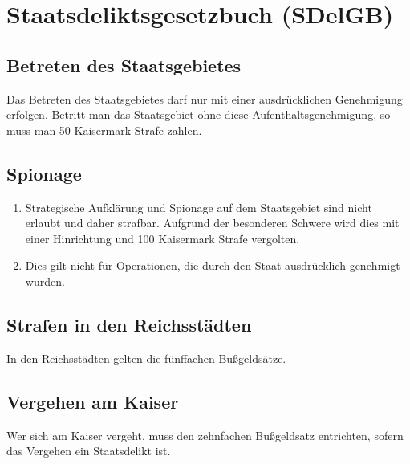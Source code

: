 \documentclass{article}
\begin{document}
\newpage
\section{Staatsdeliktsgesetzbuch (SDelGB)}
\localtableofcontents

\subsection{Betreten des Staatsgebietes}
Das Betreten des Staatsgebietes darf nur mit einer ausdrücklichen Genehmigung erfolgen. Betritt man das Staatsgebiet ohne diese Aufenthaltsgenehmigung, so muss man 50 Kaisermark Strafe zahlen.

\subsection{Spionage}
\begin{enumerate}[(1)]
    \item Strategische Aufklärung und Spionage auf dem Staatsgebiet sind nicht erlaubt und daher strafbar. Aufgrund der besonderen Schwere wird dies mit einer Hinrichtung und 100 Kaisermark Strafe vergolten.
    \item Dies gilt nicht für Operationen, die durch den Staat ausdrücklich genehmigt wurden. 
\end{enumerate}

\subsection{Strafen in den Reichsstädten}
In den Reichsstädten gelten die fünffachen Bußgeldsätze.

\subsection{Vergehen am Kaiser}
Wer sich am Kaiser vergeht, muss den zehnfachen Bußgeldsatz entrichten, sofern das Vergehen ein Staatsdelikt ist.

\end{document}

